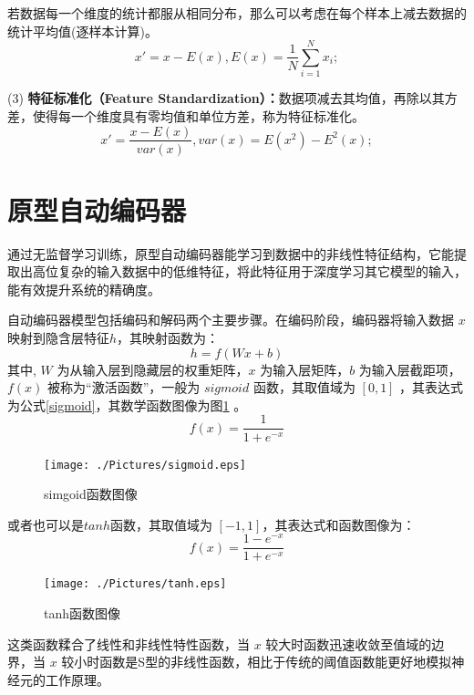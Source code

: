 \documentclass[oneside]{ZJUthesis}
\begin{document}
若数据每一个维度的统计都服从相同分布，那么可以考虑在每个样本上减去数据的统计平均值(逐样本计算)。
\begin{equation}
	x'=x-E(x),E(x)=\frac{1}{N}\sum\limits_{i=1}^{N}{x_i};
\end{equation}

(3) \textbf{特征标准化（Feature Standardization）：}数据项减去其均值，再除以其方差，使得每一个维度具有零均值和单位方差，称为特征标准化。
\begin{equation}
	x'=\frac{x-E(x)}{var(x)},var(x)=E(x^2)-E^2(x);
\end{equation}

\section{原型自动编码器}
通过无监督学习训练，原型自动编码器能学习到数据中的非线性特征结构，它能提取出高位复杂的输入数据中的低维特征，将此特征用于深度学习其它模型的输入，能有效提升系统的精确度\cite{16}。

自动编码器模型包括编码和解码两个主要步骤。在编码阶段，编码器将输入数据 $x$ 映射到隐含层特征$h$，其映射函数为：
\begin{equation}
	h=f(Wx+b)
\end{equation}
其中, $W$ 为从输入层到隐藏层的权重矩阵，$x$ 为输入层矩阵，$b$ 为输入层截距项，$f(x)$ 被称为``激活函数''，一般为 $sigmoid$ 函数，其取值域为 $[0,1]$ ，其表达式为公式\ref{sigmoid}，其数学函数图像为图\ref{fig:sigmoid}	。
\begin{equation}
	\label{sigmoid}
	f(x)=\frac{1}{1+e^{-x}}
\end{equation}
\begin{figure}[h]
\centering
\texttt{[image: ./Pictures/sigmoid.eps]}
\caption{simgoid函数图像\label{fig:sigmoid}}
\end{figure}

或者也可以是$tanh$函数，其取值域为 $[-1,1]$，其表达式和函数图像为：
\begin{equation}
	f(x)=\frac{1-e^{-x}}{1+e^{-x}}
\end{equation}
\begin{figure}[h]
\centering
\texttt{[image: ./Pictures/tanh.eps]}
\caption{tanh函数图像\label{fig:tanh}}
\end{figure}


这类函数糅合了线性和非线性特性函数，当 $x$ 较大时函数迅速收敛至值域的边界，当 $x$ 较小时函数是S型的非线性函数，相比于传统的阈值函数能更好地模拟神经元的工作原理。
\end{document}
